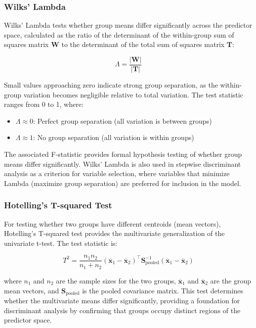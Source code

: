 \documentclass[
]{article}
\begin{document}
\subsubsection{Wilks' Lambda}

Wilks' Lambda tests whether group means differ significantly across the
predictor space, calculated as the ratio of the determinant of the
within-group sum of squares matrix \(\mathbf{W}\) to the determinant of
the total sum of squares matrix \(\mathbf{T}\):

\[\Lambda = \frac{|\mathbf{W}|}{|\mathbf{T}|}\]

Small values approaching zero indicate strong group separation, as the
within-group variation becomes negligible relative to total variation.
The test statistic ranges from 0 to 1, where:

\begin{itemize}
\item
  \(\Lambda \approx 0\): Perfect group separation (all variation is
  between groups)
\item
  \(\Lambda \approx 1\): No group separation (all variation is within
  groups)
\end{itemize}

The associated F-statistic provides formal hypothesis testing of whether
group means differ significantly. Wilks' Lambda is also used in stepwise
discriminant analysis as a criterion for variable selection, where
variables that minimize Lambda (maximize group separation) are preferred
for inclusion in the model.

\subsubsection{Hotelling's T-squared Test}

For testing whether two groups have different centroids (mean vectors),
Hotelling's T-squared test provides the multivariate generalization of
the univariate t-test. The test statistic is:

\[T^{2} = \frac{n_{1}n_{2}}{n_{1} + n_{2}}\left( \mathbf{\overline{x}}_{1} - \mathbf{\overline{x}}_{2} \right)^{\top}\mathbf{S}_{\text{pooled}}^{- 1}\left( \mathbf{\overline{x}}_{1} - \mathbf{\overline{x}}_{2} \right)\]

where \(n_{1}\) and \(n_{2}\) are the sample sizes for the two groups,
\(\mathbf{\overline{x}}_{1}\) and \(\mathbf{\overline{x}}_{2}\) are the
group mean vectors, and \(\mathbf{S}_{\text{pooled}}\) is the pooled
covariance matrix. This test determines whether the multivariate means
differ significantly, providing a foundation for discriminant analysis
by confirming that groups occupy distinct regions of the predictor
space.
\end{document}
